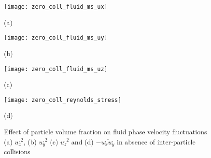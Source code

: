 \documentclass[aip,graphicx]{revtex4-1}
\begin{document}
\begin{figure*}[h!]
   \begin{minipage}{0.45\textwidth}
        	\texttt{[image: zero\_coll\_fluid\_ms\_ux]}
    	\caption*{(a)}
    \end{minipage}
    \begin{minipage}{0.45\textwidth}
  	\texttt{[image: zero\_coll\_fluid\_ms\_uy]}
  	\caption*{(b)}
  	\end{minipage}
  	\begin{minipage}{0.45\textwidth}
  	\texttt{[image: zero\_coll\_fluid\_ms\_uz]}
  	\caption*{(c)}
  	\end{minipage}
  	\begin{minipage}{0.45\textwidth}
  	\texttt{[image: zero\_coll\_reynolds\_stress]}
  	\caption*{(d)}
  	\end{minipage}
  	\caption{Effect of particle volume fraction on fluid phase velocity fluctuations (a) $\overline{u_x^{,2}}$, (b) $\overline{u_y^{,2}}$ (c) $\overline{u_z^{,2}}$ and (d) $-\overline{u_x^,u_y^,}$ in absence of inter-particle collisions}
  	\label{fig:zero_coll_uu_ms}
    \end{figure*}
\end{document}
